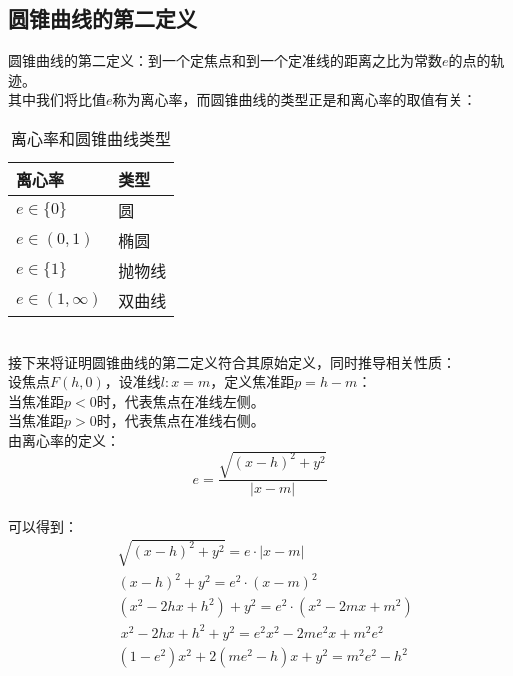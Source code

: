 \documentclass[UTF8]{ctexart}
\begin{document}
\subsection{圆锥曲线的第二定义}
    圆锥曲线的第二定义：到一个定焦点和到一个定准线的距离之比为常数$e$的点的轨迹。\\[3mm]
    其中我们将比值$e$称为离心率，而圆锥曲线的类型正是和离心率的取值有关：\vspace{5pt}
    \setcounter{equation}{0}
    \begin{table}[h]
        \begin{center}
            \begin{tabular}{l|l}
                \hline
                \textbf{离心率}\qquad\qquad\qquad\qquad&\textbf{类型}\qquad\qquad\qquad\qquad\\ \hline
                $e\in\{ 0 \}$&圆\\ \hline
                $e\in(0,1)$&椭圆\\ \hline
                $e\in\{ 1 \}$&抛物线\\ \hline
                $e\in(1,\infty)$&双曲线\\ \hline
            \end{tabular}
            \caption{离心率和圆锥曲线类型}
        \end{center}
    \end{table}\\
    接下来将证明圆锥曲线的第二定义符合其原始定义，同时推导相关性质：\\[3mm]
    设焦点$F(h,0)$，设准线$l:x=m$，定义焦准距$p=h-m$：\\[3mm]
    当焦准距$p<0$时，代表焦点在准线左侧。\\[2mm]
    当焦准距$p>0$时，代表焦点在准线右侧。\\[6mm]
    由离心率的定义：
    \setcounter{equation}{0}
    \begin{equation}
        e=\frac{\sqrt{(x-h)^2+y^2}}{|x-m|}
    \end{equation}\\[1mm]
    可以得到：
    \begin{align}
        &\sqrt{(x-h)^2+y^2}=e\cdot|x-m|\\[3mm]
        &(x-h)^2+y^2=e^2\cdot(x-m)^2\\[3mm]
        &(x^2-2hx+h^2)+y^2=e^2\cdot\left(x^2-2mx+m^2\right)\\[3mm]
        &~x^2-2hx+h^2+y^2=e^2x^2-2me^2x+m^2e^2\\[3mm]
        &\left(1-e^2\right)x^2+2\left(me^2-h\right)x+y^2=m^2e^2-h^2
    \end{align}
\end{document}
